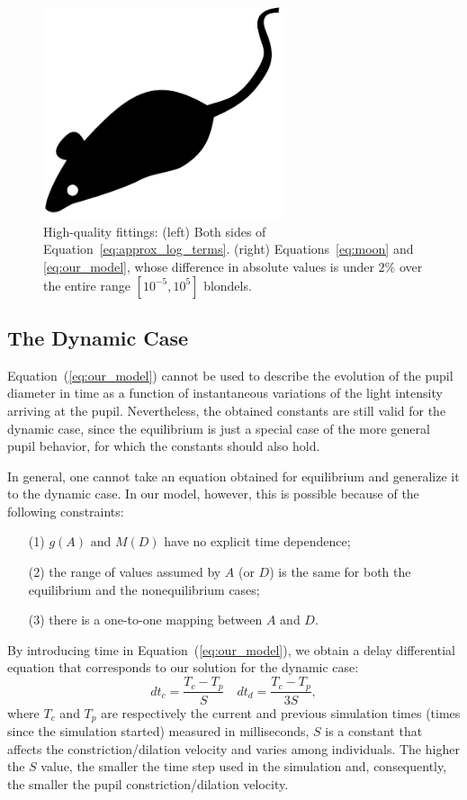 \documentclass{acmtog} %
\begin{document}
\begin{figure}[t]
\centerline{\includegraphics[width=7cm]{tog-sample-mouse}}
\caption{High-quality fittings: (left) Both sides of
Equation~\ref{eq:approx_log_terms}. (right) Equations~\ref{eq:moon} and
\ref{eq:our_model}, whose difference in absolute values is under $2\%$
over the entire range $[10^{-5}, 10^{5}]$ blondels.}
    \label{fig:Longtin_v_Moon_right_and_comparison}
\end{figure}
%
\subsection{The Dynamic Case}
\label{subsec:DynamicCase}
%
Equation~(\ref{eq:our_model}) cannot be used to describe the evolution
of the pupil diameter in time as a function of instantaneous variations
of the light intensity arriving at the pupil. Nevertheless, the obtained
constants are still valid for the dynamic case, since the equilibrium is
just a special case of the more general pupil behavior, for which the
constants should also hold.

In general, one cannot take an equation obtained for equilibrium and
generalize it to the dynamic case. In our model, however, this is
possible because of the following constraints:
\begin{enumerate}
\item[(1)] $g(A)$ and $M(D)$ have no explicit time dependence;
\item[(2)] the range of values assumed by $A$ (or $D$) is the same for
both the equilibrium and the nonequilibrium cases;
\item[(3)] there is a one-to-one mapping between $A$ and $D$.
\end{enumerate}

By introducing time in Equation~(\ref{eq:our_model}), we obtain a delay differential equation that
corresponds to our solution for the dynamic case:
\begin{equation}
\label{eq:dTEval}
  {{dt}}_{c} = \frac{T_{c} - T_{p}}{S} \quad
  {{dt}}_{d} = \frac{T_{c} - T_{p}}{3S},
\end{equation}
where $T_{c}$ and $T_{p}$ are respectively the current and previous
simulation times (times since the simulation started) measured in
milliseconds, $S$ is a constant that affects the constriction/dilation
velocity and varies among individuals. The higher the $S$ value, the
smaller the time step used in the simulation and, consequently, the
smaller the pupil constriction/dilation velocity.
\end{document}
